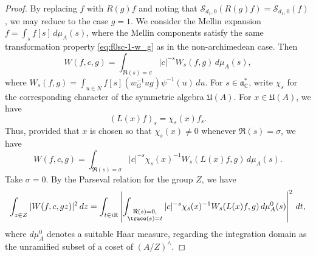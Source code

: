 \begin{proof}
  By replacing $f$ with $R(g) f$ and noting that $\mathcal{S}_{d_1,0}(R(g) f) = \mathcal{S}_{d_1,0}(f)$, we may reduce to the case $g = 1$.  We consider the Mellin expansion $f = \int_s f[s] \, d \mu_A(s)$, where the Mellin components satisfy the same transformation property \eqref{eq:f0sc-1-w_g} as in the non-archimedean case.  Then
  \begin{equation*}
    W(f,c,g) =
    \int_{\Re(s) = \sigma}
    |c|^{-s} W_s(f,g) \, d \mu_A(s),
  \end{equation*}
  where $W_s(f,g) = \int_{u \in N} f[s](w^{-1}_G u g) \psi^{-1}(u) \, d u$.  For $s \in \mathfrak{a}_{\mathbb{C}}^*$, write $\chi_s$ for the corresponding character of the symmetric algebra $\mathfrak{U}(A)$.  For $x \in \mathfrak{U}(A)$, we have
  \begin{equation*}
    (L(x) f)_s = \chi_s(x) f_s.
  \end{equation*}
  Thus, provided that $x$ is chosen so that $\chi_s(x) \neq 0$ whenever $\Re(s) = \sigma$, we have
  \begin{equation}\label{eq:wf-c-g}
    W(f,c,g) =
    \int_{\Re(s) = \sigma}
    |c|^{-s} \chi_s(x)^{-1} W_s(L(x) f,g) \, d \mu_A(s).
  \end{equation}
  Take $\sigma = 0$.  By the Parseval relation for the group $Z$, we have
  \begin{equation*}
    \int_{z \in Z} |W(f, c, g z)|^2 \, d z
    =
    \int_{t \in i \mathbb{R} }
    \left\lvert
      \int_{
        \substack{
          \Re(s) = 0,  \\
          \trace(s) = t
        }
      }
      |c|^{-s} \chi_s(x)^{-1} W_s(L(x) f, g ) \, d \mu_A^0(s)
    \right\rvert^2
    \, d t,
  \end{equation*}
  where $d \mu_A^0$ denotes a suitable Haar measure, regarding the integration domain as the unramified subset of a coset of $(A/Z)^\wedge$.


\end{proof}

